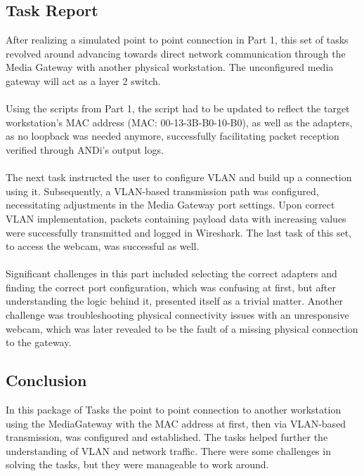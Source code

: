 \subsection{Task Report}
After realizing a simulated point to point connection in Part 1, this set of tasks revolved around advancing towards direct network communication through the Media Gateway with another physical workstation. The unconfigured media gateway will act as a layer 2 switch. \\\\
Using the scripts from Part 1, the script had to be updated to reflect the target workstation’s MAC address (MAC: 00-13-3B-B0-10-B0), as well as the adapters, as no loopback was needed anymore, successfully facilitating packet reception verified through ANDi's output logs.\\\\
The next task instructed the user to configure VLAN and build up a connection using it. Subsequently, a VLAN-based transmission path was configured, necessitating adjustments in the Media Gateway port settings. Upon correct VLAN implementation, packets containing payload data with increasing values were successfully transmitted and logged in Wireshark. The last task of this set, to access the webcam, was successful as well.\\\\
Significant challenges in this part included selecting the correct adapters and finding the correct port configuration, which was confusing at first, but after understanding the logic behind it, presented itself as a trivial matter. Another challenge was troubleshooting physical connectivity issues with an unresponsive webcam, which was later revealed to be the fault of a missing physical connection to the gateway.

\subsection{Conclusion}
In this package of Tasks the point to point connection to another workstation using the MediaGateway with the MAC address at first, then via VLAN-based transmission, was configured and established. The tasks helped further the understanding of VLAN and network traffic. There were some challenges in solving the tasks, but they were manageable to work around. 






